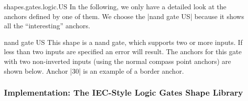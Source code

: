 \begin{pgflibrary}{shapes.gates.logic.US}
  In the following, we only have a detailed look at the anchors
  defined by one of them. We choose the |nand gate US| because it
  shows all the ``interesting'' anchors.

  \begin{shape}{nand gate US}
    This shape is a nand gate, which supports two or more inputs. If
    less than two inputs are specified an error will result. 
    The anchors for this gate with two
    non-inverted inputs (using the normal compass point anchors) are
    shown below. Anchor |30| is an example of a border anchor.
 
\begin{codeexample}[]
\Huge
{}
\end{codeexample}
  \end{shape}
\end{pgflibrary}



\subsubsection{Implementation: The IEC-Style Logic Gates Shape Library}

